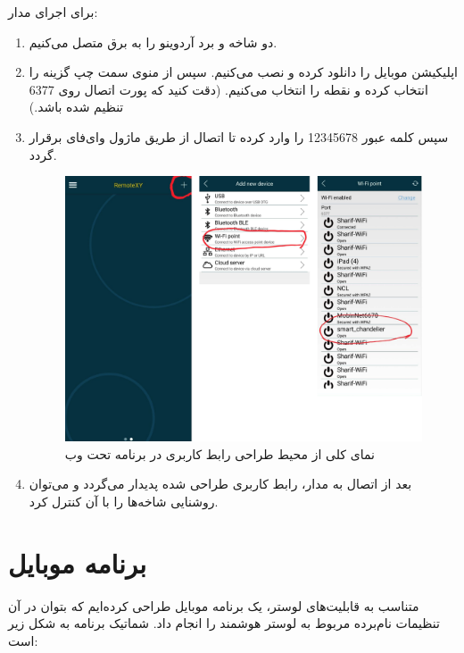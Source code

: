 \documentclass[12pt,a4paper]{article}
\begin{document}
برای اجرای مدار:
\begin {enumerate}
\item
دو شاخه  و برد آردوینو را به برق متصل می‌کنیم.
\item
اپلیکیشن موبایل  را دانلود کرده و نصب می‌کنیم. سپس از منوی سمت چپ گزینه   را انتخاب کرده و نقطه   را انتخاب می‌کنیم. (دقت کنید که پورت اتصال روی 6377 تنظیم شده باشد.)
\item
سپس کلمه عبور 12345678 را وارد کرده تا اتصال از طریق ماژول وای‌فای برقرار گردد.
 	 \begin{figure}[H]
	\centering
	\includegraphics[scale=0.3]{figs/item3.png}
	\caption{
		نمای کلی از محیط طراحی رابط کاربری در برنامه تحت وب 
	}
	\label{fig:schema1}
\end{figure}
\item
بعد از اتصال به مدار، رابط کاربری طراحی شده پدیدار می‌گردد و می‌توان روشنایی شاخه‌ها را با آن کنترل کرد.

\end {enumerate}


	\newpage
\section{برنامه موبایل}
متناسب به قابلیت‌های لوستر، یک برنامه موبایل طراحی کرده‌ایم که بتوان در آن تنظیمات نام‌برده مربوط به لوستر هوشمند را انجام داد. شماتیک برنامه به شکل زیر است:
\end{document}
